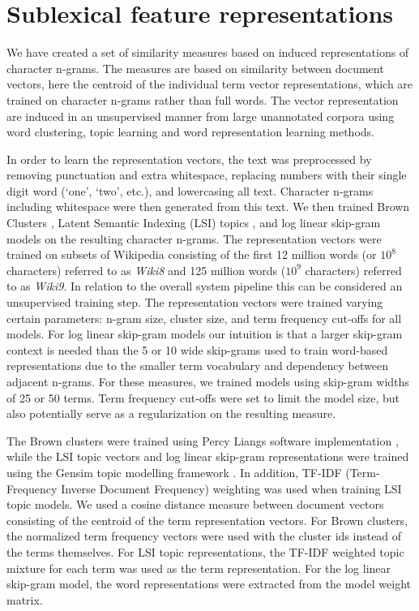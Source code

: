 \section{Sublexical feature representations}
\label{subrep-features}

We have created a set of similarity measures based on induced representations of character n-grams. The measures are based on similarity between document vectors, here the centroid of the individual term vector representations, which are trained on character n-grams rather than full words. The vector representation are induced in an unsupervised manner from large unannotated corpora using word clustering, topic learning and word representation learning methods.

In order to learn the representation vectors, the text was preprocessed by removing punctuation and extra whitespace, replacing numbers with their single digit word (`one', `two', etc.), and lowercasing all text. Character n-grams including whitespace were then generated from this text. We then trained Brown Clusters \cite{brown1992class}, Latent Semantic Indexing (LSI) topics \cite{deerwester1990indexing}, and log linear skip-gram models \cite{mikolov2013efficient} on the resulting character n-grams. The representation vectors were trained on subsets of Wikipedia consisting of the first 12 million words (or $10^8$ characters) referred to as {\it Wiki8} and 125 million words ($10^9$ characters) referred to as {\it Wiki9}. In relation to the overall system pipeline this can be considered an unsupervised training step.
The representation vectors were trained varying certain parameters: n-gram size, cluster size, and term frequency cut-offs for all models.
For log linear skip-gram models our intuition is that a larger skip-gram context is needed than the 5 or 10 wide skip-grams 
used to train word-based representations due to the smaller term vocabulary and dependency between adjacent n-grams.
 For these measures, we trained models using skip-gram widths of 25 or 50 terms. 
Term frequency cut-offs were set to limit the model size, but also potentially serve as a regularization on the resulting measure.

The Brown clusters were trained using Percy Liangs software implementation \cite{liang2005semi}, while the LSI topic vectors and log linear skip-gram representations were trained using the Gensim topic modelling framework \cite{gensim_lrec}. 
In addition, TF-IDF (Term-Frequency Inverse Document Frequency) weighting was used when training LSI topic models. 
We used a cosine distance measure between document vectors consisting of the centroid of the term representation vectors. 
For Brown clusters, the normalized term frequency vectors were used with the cluster ids instead of the terms themselves. 
For LSI topic representations, the TF-IDF weighted topic mixture for each term was used as the term representation. 
For the log linear skip-gram model, the word representations were extracted from the model weight matrix.

